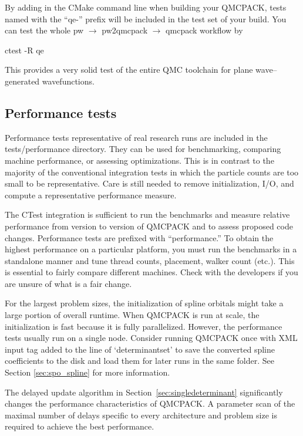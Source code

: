 By adding  in the CMake command line when building your QMCPACK,
tests named with the ``qe-'' prefix will be included in the test set of your build.
You can test the whole pw $\to$ pw2qmcpack $\to$ qmcpack workflow by

\begin{shade}
ctest -R qe
\end{shade}
This provides a very solid test of the entire QMC
toolchain for plane wave--generated wavefunctions.

\subsection{Performance tests}
\label{sec:perftests}
Performance tests representative of real research runs are included in the
tests/performance directory. They can be used for benchmarking, comparing machine
performance, or assessing optimizations. This is in
contrast to the majority of the conventional integration tests in which the particle
counts are too small to be representative. Care is still needed to
remove initialization, I/O, and compute a representative performance
measure.

The CTest integration is sufficient to run the benchmarks and measure
relative performance from version to version of QMCPACK and to assess
proposed code changes. Performance tests are prefixed with
``performance.'' To obtain the highest performance on a particular
platform, you must run the benchmarks in a standalone manner and tune
thread counts, placement, walker count (etc.). This is essential to
fairly compare different machines. Check with the
developers if you are unsure of what is a fair change.

For the largest problem sizes, the initialization of spline orbitals might
take a large portion of overall runtime. When QMCPACK is run at scale,
the initialization is fast because it is fully
parallelized. However, the performance tests usually run on a single node.
Consider running QMCPACK once with  XML input tag
added to the line of `determinantset' to save the converted spline
coefficients to the disk and load them for later runs in the same folder.
See Section \ref{sec:spo_spline} for more information.

The delayed update algorithm in Section~\ref{sec:singledeterminant}
significantly changes the performance characteristics of QMCPACK.  A
parameter scan of the maximal number of delays specific to every
architecture and problem size is required to achieve the best
performance.

